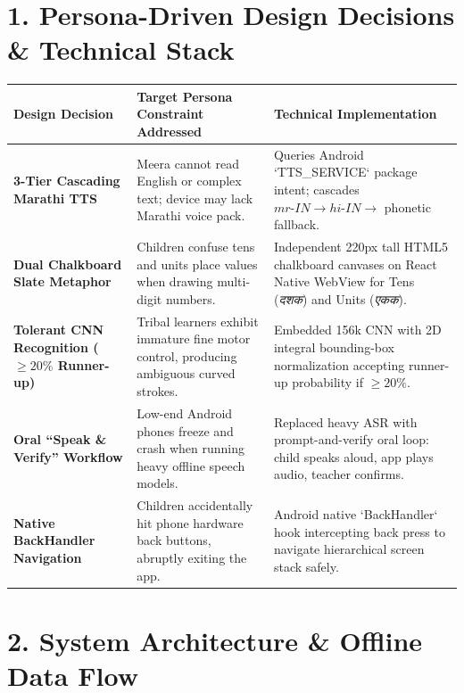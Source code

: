 \documentclass[10pt,a4paper]{article}
\begin{document}
\clearpage

\section*{1. Persona-Driven Design Decisions \& Technical Stack}

\begin{table}[h!]
\centering
\scriptsize
\renewcommand{\arraystretch}{1.14}
\begin{tabularx}{\textwidth}{@{}p{3.2cm} p{4.5cm} X@{}}
\toprule
\rowcolor{primary!10}
\textbf{Design Decision} & \textbf{Target Persona Constraint Addressed} & \textbf{Technical Implementation} \\
\midrule
\textbf{3-Tier Cascading Marathi TTS} & Meera cannot read English or complex text; device may lack Marathi voice pack. & Queries Android `TTS\_SERVICE` package intent; cascades $mr\text{-}IN \rightarrow hi\text{-}IN \rightarrow$ phonetic fallback. \\
\textbf{Dual Chalkboard Slate Metaphor} & Children confuse tens and units place values when drawing multi-digit numbers. & Independent 220px tall HTML5 chalkboard canvases on React Native WebView for Tens (\textit{दशक}) and Units (\textit{एकक}). \\
\textbf{Tolerant CNN Recognition ($\ge 20\%$ Runner-up)} & Tribal learners exhibit immature fine motor control, producing ambiguous curved strokes. & Embedded 156k CNN with 2D integral bounding-box normalization accepting runner-up probability if $\ge 20\%$. \\
\textbf{Oral ``Speak \& Verify'' Workflow} & Low-end Android phones freeze and crash when running heavy offline speech models. & Replaced heavy ASR with prompt-and-verify oral loop: child speaks aloud, app plays audio, teacher confirms. \\
\textbf{Native BackHandler Navigation} & Children accidentally hit phone hardware back buttons, abruptly exiting the app. & Android native `BackHandler` hook intercepting back press to navigate hierarchical screen stack safely. \\
\bottomrule
\end{tabularx}
\end{table}

\vspace{-4pt}
\section*{2. System Architecture \& Offline Data Flow}
\end{document}
